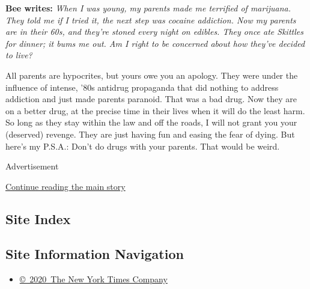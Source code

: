 \textbf{Bee writes:} \emph{When I was young, my parents made me
terrified of marijuana. They told me if I tried it, the next step was
cocaine addiction. Now my parents are in their 60s, and they're stoned
every night on edibles. They once ate Skittles for dinner; it bums me
out. Am I right to be concerned about how they've decided to live?}

All parents are hypocrites, but yours owe you an apology. They were
under the influence of intense, '80s antidrug propaganda that did
nothing to address addiction and just made parents paranoid. That was a
bad drug. Now they are on a better drug, at the precise time in their
lives when it will do the least harm. So long as they stay within the
law and off the roads, I will not grant you your (deserved) revenge.
They are just having fun and easing the fear of dying. But here's my
P.S.A.: Don't do drugs with your parents. That would be weird.

Advertisement

\protect\hyperlink{after-bottom}{Continue reading the main story}

\hypertarget{site-index}{%
\subsection{Site Index}\label{site-index}}

\hypertarget{site-information-navigation}{%
\subsection{Site Information
Navigation}\label{site-information-navigation}}

\begin{itemize}
\tightlist
\item
  \href{https://help.nytimes3xbfgragh.onion/hc/en-us/articles/115014792127-Copyright-notice}{©~2020~The
  New York Times Company}
\end{itemize}


